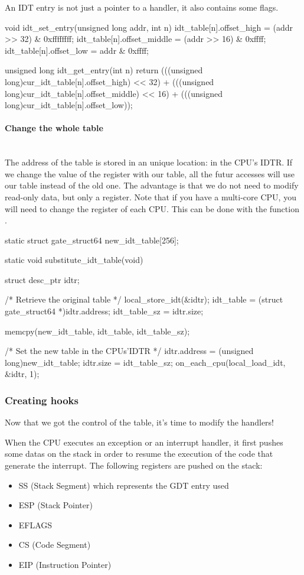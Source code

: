 An IDT entry is not just a pointer to a handler, it also contains some flags.

\begin{ccode}
void idt_set_entry(unsigned long addr, int n) {
    idt_table[n].offset_high = (addr >> 32) & 0xffffffff;
    idt_table[n].offset_middle = (addr >> 16) & 0xffff;
    idt_table[n].offset_low = addr & 0xffff;
}

unsigned long idt_get_entry(int n) {
    return (((unsigned long)cur_idt_table[n].offset_high) << 32)
         + (((unsigned long)cur_idt_table[n].offset_middle) << 16)
         + (((unsigned long)cur_idt_table[n].offset_low));
}
\end{ccode}

\paragraph{Change the whole table}\mbox{}\\
The address of the table is stored in an unique location: in the CPU's IDTR.
If we change the value of the register with our table, all the futur accesses
will use our table instead of the old one. The advantage is that we do not need
to modify read-only data, but only a register.
Note that if you have a multi-core CPU, you will need to change the register
of each CPU. This can be done with the function .

\begin{ccode}
static struct gate_struct64 new_idt_table[256];

static void substitute_idt_table(void) {
    struct desc_ptr idtr;

    /* Retrieve the original table */
    local_store_idt(&idtr);
    idt_table = (struct gate_struct64 *)idtr.address;
    idt_table_sz = idtr.size;

    memcpy(new_idt_table, idt_table, idt_table_sz);

    /* Set the new table in the CPUs'IDTR */
    idtr.address = (unsigned long)new_idt_table;
    idtr.size = idt_table_sz;
    on_each_cpu(local_load_idt, &idtr, 1);
}
\end{ccode}


\subsubsection{Creating hooks}
Now that we got the control of the table, it's time to modify the handlers!

When the CPU executes an exception or an interrupt handler, it first pushes
some datas on the stack in order to resume the execution of the code that
generate the interrupt. The following registers are pushed on the stack:
\begin{itemize}
    \item SS (Stack Segment) which represents the GDT entry used
    \item ESP (Stack Pointer)
    \item EFLAGS
    \item CS (Code Segment)
    \item EIP (Instruction Pointer)
\end{itemize}

